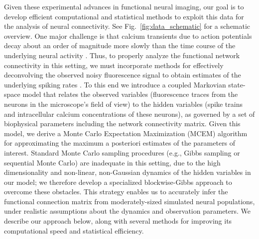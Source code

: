 Given these experimental advances in functional neural imaging, our goal is to develop efficient computational and statistical methods to exploit this data for the analysis of neural connectivity. See Fig.~\ref{fig:data_schematic} for a schematic overview. One major challenge is that calcium transients due to action potentials decay about an order of magnitude more slowly than the time course of the underlying neural activity \cite{ImagingManual}. Thus, to properly analyze the functional network connectivity in this setting, we must incorporate methods for effectively deconvolving the observed noisy fluorescence signal to obtain estimates of the underlying spiking rates \cite{YaksiFriedrich06,GreenbergKerr08,Vogelstein2009}. To this end we introduce a coupled Markovian state-space model that relates the observed variables (fluorescence traces from the neurons in the microscope's field of view) to the hidden variables (spike trains and intracellular calcium concentrations of these neurons), as governed by a set of biophysical parameters including the network connectivity matrix. Given this model, we derive a Monte Carlo Expectation Maximization (MCEM) algorithm for approximating the maximum a posteriori estimates of the parameters of interest. Standard Monte Carlo sampling procedures (e.g., Gibbs sampling or sequential Monte Carlo) are inadequate in this setting, due to the high dimensionality and non-linear, non-Gaussian dynamics of the hidden variables in our model; we therefore develop a specialized blockwise-Gibbs approach to overcome these obstacles. This strategy enables us to accurately infer the functional connection matrix from moderately-sized simulated neural populations, under realistic assumptions about the dynamics and observation parameters. We describe our approach below, along with several methods for improving its computational speed and statistical efficiency.


